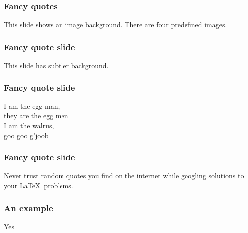\documentclass[8pt]{beamer} %
\begin{document}
\begin{frame}[image 1]

  \frametitle{Fancy quotes}
  \begin{fancyquote}[Unknown]
    This slide shows an image background. There are four predefined images.
  \end{fancyquote}
\end{frame}

\begin{frame}[image 2]
\frametitle{Fancy quote slide}
\begin{fancyquote}[T.S. Eliot]
This slide has subtler background.
\end{fancyquote}
\end{frame}

\begin{frame}[image 3]
\frametitle{Fancy quote slide}
\begin{fancyquote}
I am the egg man, \\
they are the egg men \\
I am the walrus, \\
goo goo g'joob
\end{fancyquote}
\end{frame}

\begin{frame}[image 4]
\frametitle{Fancy quote slide}
\begin{fancyquote}
Never trust random quotes you find on the internet while googling solutions to your \LaTeX~problems.
\end{fancyquote}
\end{frame}

\begin{frame}
  \frametitle{An example}
  \begin{example}[Ok]
  Yes
  \end{example}
\end{frame}

\end{document}

